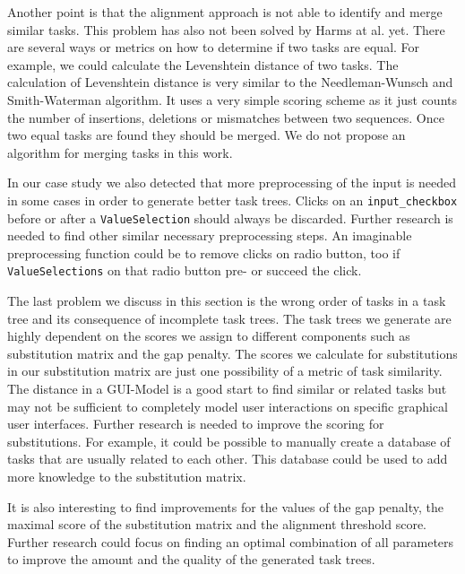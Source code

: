Another point is that the alignment approach is not able to identify and merge similar tasks. 
This problem has also not been solved by Harms at al. yet. 
There are several ways or metrics on how to determine if two tasks are equal.
For example, we could calculate the Levenshtein distance of two tasks. 
The calculation of Levenshtein distance is very similar to the Needleman-Wunsch and Smith-Waterman algorithm. 
It uses a very simple scoring scheme as it just counts the number of insertions, deletions or mismatches between two sequences.
Once two equal tasks are found they should be merged. 
We do not propose an algorithm for merging tasks in this work.

In our case study we also detected that more preprocessing of the input is needed in some cases in order to generate better task trees.
Clicks on an \texttt{input\_checkbox} before or after a \texttt{ValueSelection} should always be discarded. 
Further research is needed to find other similar necessary preprocessing steps. 
An imaginable preprocessing function could be to remove clicks on radio button, too if \texttt{ValueSelections} on that radio button pre- or succeed the click.

The last problem we discuss in this section is the wrong order of tasks in a task tree and its consequence of incomplete task trees.
The task trees we generate are highly dependent on the scores we assign to different components such as substitution matrix and the gap penalty.
The scores we calculate for substitutions in our substitution matrix are just one possibility of a metric of task similarity. 
The distance in a GUI-Model is a good start to find similar or related tasks but may not be sufficient to completely model user interactions on specific graphical user interfaces.
Further research is needed to improve the scoring for substitutions. 
For example, it could be possible to manually create a database of tasks that are usually related to each other.
This database could be used to add more knowledge to the substitution matrix.

It is also interesting to find improvements for the values of the gap penalty, the maximal score of the substitution matrix and the alignment threshold score.
Further research could focus on finding an optimal combination of all parameters to improve the amount and the quality of the generated task trees.



